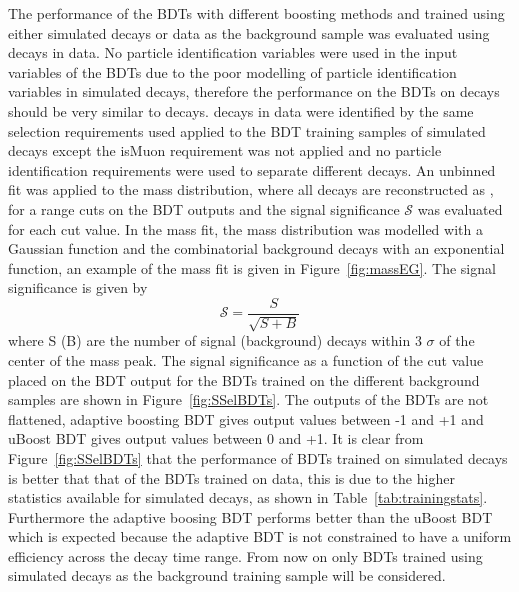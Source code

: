The performance of the BDTs with different boosting methods and trained using either simulated decays or data as the background sample was evaluated using \bhh decays in data. No particle identification variables were used in the input variables of the BDTs due to the poor modelling of particle identification variables in simulated decays, therefore the performance on the BDTs on \bhh decays should be very similar to \bsmumu decays. \bhh decays in data were identified by the same selection requirements used applied to the BDT training samples of simulated decays except the isMuon requirement was not applied and no particle identification requirements were used to separate different \bhh decays. An unbinned \ml fit was applied to the \bhh mass distribution, where all \bhh decays are reconstructed as \bsmumu, for a range cuts on the BDT outputs and the signal significance $\mathcal{S}$  was evaluated for each cut value. In the mass fit, the \bhh mass distribution was modelled with a Gaussian function and the combinatorial background decays with an exponential function, an example of the mass fit is given in Figure~\ref{fig:massEG}. The signal significance is given by
\begin{equation}
\mathcal{S} = \frac{S}{\sqrt{S+B}}
\label{eq:SigSigf}
\end{equation} 
where S (B) are the number of signal (background) decays within 3 $\sigma$ of the center of the \bhh mass peak. 
The signal significance as a function of the cut value placed on the BDT output for the BDTs trained on the different background samples are shown in Figure~\ref{fig:SSelBDTs}. The outputs of the BDTs are not flattened, adaptive boosting BDT gives output values between -1 and +1 and uBoost BDT gives output values between 0 and +1. It is clear from Figure~\ref{fig:SSelBDTs} that the performance of BDTs trained on simulated decays is better that that of the BDTs trained on data, this is due to the higher statistics available for simulated decays, as shown in Table~\ref{tab:trainingstats}. Furthermore the adaptive boosing BDT performs better than the uBoost BDT which is expected because the adaptive BDT is not constrained to have a uniform efficiency across the decay time range. From now on only BDTs trained using simulated decays as the background training sample will be considered.
